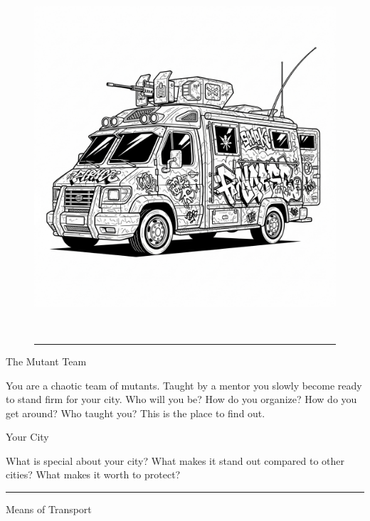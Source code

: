 
\vspace*{\fill}

\begin{figure}[h!]
\centering\includegraphics[height=13cm]{images/van}
\vspace{-\baselineskip}\vspace{+0.1pt}
\rule{\linewidth}{2pt}
\end{figure}
\Huge{}The Mutant Team

\normalfont\large
\medskip

You are a chaotic team of mutants. Taught by a mentor you slowly become ready to stand firm for your city. Who will you be? How do you organize? How do you get around? Who taught you? This is the place to find out.

\newpage

\Large{}Your City
\normalfont\large
\medskip

What is special about your city? What makes it stand out compared to other cities? What makes it worth to protect?\\

\rule{\linewidth}{1pt}

\medskip

\Large{}Means of Transport
\normalfont\large


